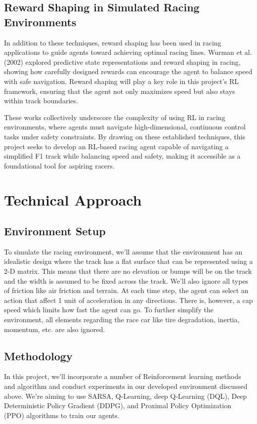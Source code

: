 \documentclass{article}
\begin{document}
\subsection{Reward Shaping in Simulated Racing Environments}
In addition to these techniques, reward shaping has been used in racing applications to guide agents toward achieving optimal racing lines. Wurman et al. (2002) \cite{wurman2002racing} explored predictive state representations and reward shaping in racing, showing how carefully designed rewards can encourage the agent to balance speed with safe navigation. Reward shaping will play a key role in this project’s RL framework, ensuring that the agent not only maximizes speed but also stays within track boundaries.

These works collectively underscore the complexity of using RL in racing environments, where agents must navigate high-dimensional, continuous control tasks under safety constraints. By drawing on these established techniques, this project seeks to develop an RL-based racing agent capable of navigating a simplified F1 track while balancing speed and safety, making it accessible as a foundational tool for aspiring racers.


\section{Technical Approach}
\subsection{Environment Setup}
To simulate the racing environment, we'll assume that the environment has an
idealistic design where the track has a flat surface that can be represented
using a 2-D matrix. This means that there are no elevation or bumps will be on the track and the width is assumed to be fixed across the track. 
We'll also ignore all types of friction like air friction and terrain. 
At each time step, the agent can select an action that affect 1 unit of acceleration in any directions. 
There is, however, a cap speed which limits how fast the agent can go. 
To further simplify the environment, all elements regarding the race car like tire degradation, inertia, momentum, etc. are also ignored.

\subsection{Methodology}
In this project, we'll incorporate a number of Reinforcement learning methods and algorithm and conduct experiments in our developed environment discussed above.
We're aiming to use SARSA, Q-Learning, deep Q-Learning (DQL), Deep Deterministic Policy Gradient (DDPG), and Proximal Policy Optimization (PPO) algorithms to train our agents.
\end{document}
